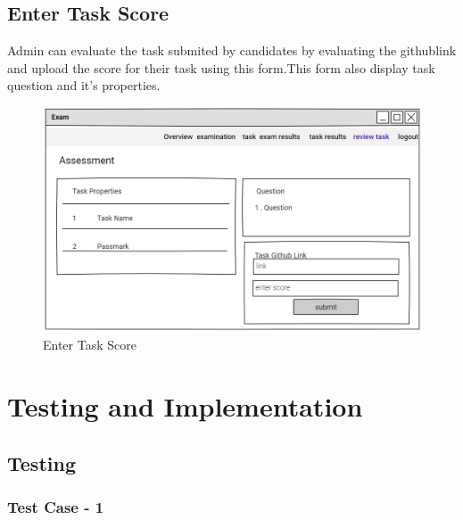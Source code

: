 \documentclass[a4paper,12pt]{report}
\begin{document}
\subsection {  Enter Task Score}
Admin can evaluate the task submited by candidates by evaluating the githublink and upload the score for their task using this form.This form also display task question and it's properties.
\begin{figure}[bph]
	\centering
	\includegraphics[width=.7\linewidth]{img/admin/rvwtsk3}
	\caption{Enter Task Score}
\end{figure}

\pagebreak

\section{Testing and Implementation}

\subsection{Testing}
\subsubsection{Test Case - 1 }
\end{document}
